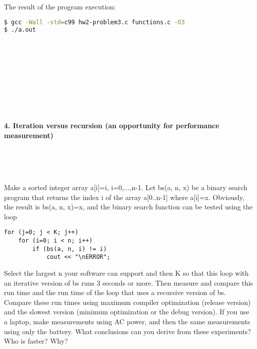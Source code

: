 \documentclass{article}
\begin{document}
\paragraph{}\
\paragraph{}\
		
		\rmfamily
		\noindent The result of the program execution:
		
		\ttfamily
		\begin{lstlisting}[language=bash]
$ gcc -Wall -std=c99 hw2-problem3.c functions.c -O3
$ ./a.out
		\end{lstlisting}
		
\paragraph{}\	
\paragraph{}\
\paragraph{}\
\paragraph{}\

	\rmfamily
	
	\paragraph{4. Iteration versus recursion (an opportunity for performance measurement) }\
	
	\rmfamily\
	
		Make a sorted integer array a[i]=i, i=0,...,n-1.  Let bs(a, n, x) be a binary search program that returns the index i of the array a[0..n-1] where a[i]=x. Obviously, the result is bs(a, n, x)=x, and the binary search function can be tested using the loop
		
		\begin{verbatim}
for (j=0; j < K; j++)
    for (i=0; i < n; i++)
        if (bs(a, n, i) != i)
            cout << "\nERROR";
		\end{verbatim}
		
		
		Select the largest n your software can support and then K so that this loop with an iterative version of bs runs 3 seconds or more. Then measure and compare this run time and the run time of the loop that uses a recursive version of bs. Compare these run times using maximum compiler optimization (release version) and the slowest version (minimum optimization or the debug version). If you use a laptop, make measurements using AC power, and then the same measurements using only the battery. What conclusions can you derive from these experiments? Who is faster? Why?
		\newline
		
\end{document}
